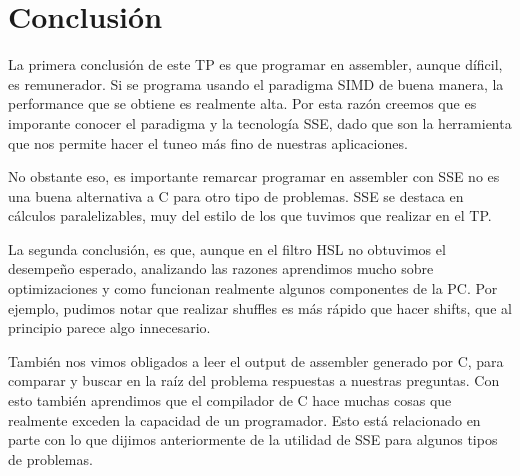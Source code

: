 \section{Conclusión}

La primera conclusión de este TP es que programar en assembler, aunque díficil, es remunerador. Si se programa usando el paradigma SIMD de buena manera, la performance que se obtiene es realmente alta. Por esta razón creemos que es imporante conocer el paradigma y la tecnología SSE, dado que son la herramienta que nos permite hacer el tuneo más fino de nuestras aplicaciones.

No obstante eso, es importante remarcar programar en assembler con SSE no es una buena alternativa a C para otro tipo de problemas. SSE se destaca en cálculos paralelizables, muy del estilo de los que tuvimos que realizar en el TP.

La segunda conclusión, es que, aunque en el filtro HSL no obtuvimos el desempeño esperado, analizando las razones aprendimos mucho sobre optimizaciones y como funcionan realmente algunos componentes de la PC. Por ejemplo, pudimos notar que realizar shuffles es más rápido que hacer shifts, que al principio parece algo innecesario.

También nos vimos obligados a leer el output de assembler generado por C, para comparar y buscar en la raíz del problema respuestas a nuestras preguntas. Con esto también aprendimos que el compilador de C hace muchas cosas que realmente exceden la capacidad de un programador. Esto está relacionado en parte con lo que dijimos anteriormente de la utilidad de SSE para algunos tipos de problemas. 







